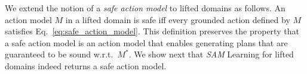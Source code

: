 \documentclass{article}
\newcommand{\realm}{\ensuremath{M^*}\xspace}
\newcommand{\sam}{\textit{SAM}\xspace}
\begin{document}
We extend the notion of a \emph{safe action model} to lifted domains as follows. An action model $M$ in a lifted domain is safe iff 
every grounded action defined by $M$ satisfies Eq.~\ref{eq:safe_action_model}. 
This definition preserves the property that a safe action model is an action model that enables generating plans that are guaranteed to be sound w.r.t.\ $\realm$. 
We show next that \sam Learning for lifted domains indeed returns a safe action model. 


\end{document}
